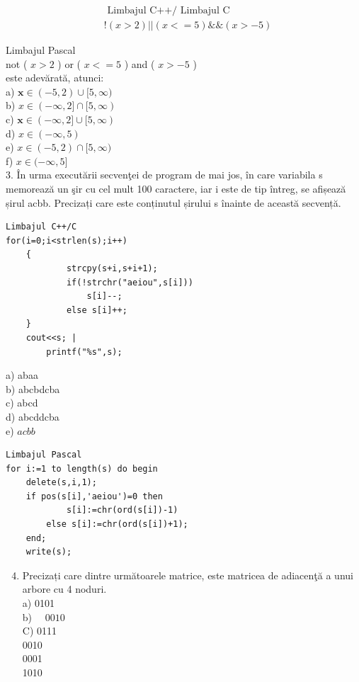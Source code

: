 \documentclass[10pt]{article}
\begin{document}
$$
\begin{aligned}
& \text { Limbajul C++/ Limbajul C } \\
& !(x>2)| |(x<=5) \& \&(x>-5)
\end{aligned}
$$

Limbajul Pascal\\
not ( $x>2$ ) or ( $x<=5$ ) and ( $x>-5$ )\\
este adevărată, atunci:\\
a) $\mathbf{x} \in(-5,2) \cup[5, \infty)$\\
b) $x \in(-\infty, 2] \cap[5, \infty)$\\
c) $\mathbf{x} \in(-\infty, 2] \cup[5, \infty)$\\
d) $x \in(-\infty, 5)$\\
e) $x \in(-5,2) \cap[5, \infty)$\\
f) $x \in(-\infty, 5]$\\
3. În urma executării secvenţei de program de mai jos, în care variabila s memorează un şir cu cel mult 100 caractere, iar i este de tip întreg, se afișează șirul acbb. Precizați care este conținutul șirului s înainte de această secvență.

\begin{verbatim}
Limbajul C++/C
for(i=0;i<strlen(s);i++)
    {
            strcpy(s+i,s+i+1);
            if(!strchr("aeiou",s[i]))
                s[i]--;
            else s[i]++;
    }
    cout<<s; |
        printf("%s",s);
\end{verbatim}

a) abaa\\
b) abcbdcba\\
c) abcd\\
d) abcddcba\\
e) $a c b b$

\begin{verbatim}
Limbajul Pascal
for i:=1 to length(s) do begin
    delete(s,i,1);
    if pos(s[i],'aeiou')=0 then
            s[i]:=chr(ord(s[i])-1)
        else s[i]:=chr(ord(s[i])+1);
    end;
    write(s);
\end{verbatim}

\begin{enumerate}
  \setcounter{enumi}{3}
  \item Precizați care dintre următoarele matrice, este matricea de adiacenţă a unui arbore cu 4 noduri.\\
a) 0101\\
b) $\quad 0010$\\
C) 0111\\
0010\\
0001\\
1010
\end{enumerate}
\end{document}
